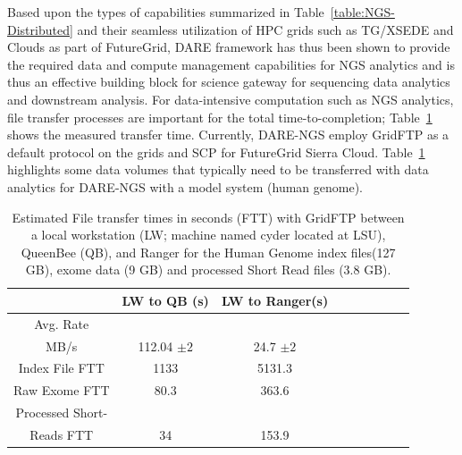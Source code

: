 \documentclass[]{svjour3}
\begin{document}

Based upon the types of capabilities summarized in
Table~\ref{table:NGS-Distributed} and their seamless utilization of
HPC grids such as TG/XSEDE and Clouds as part of
FutureGrid\cite{dare-ecmls11}, DARE framework has thus been shown to
provide the required data and compute management capabilities for NGS
analytics and is thus an effective building block for science gateway
for sequencing data analytics and downstream analysis.  For
data-intensive computation such as NGS analytics, file transfer
processes are important for the total time-to-completion;
Table~\ref{table:NGS-Distributed-file} shows the measured transfer
time. Currently, DARE-NGS employ GridFTP as a default protocol on the
grids and SCP for FutureGrid Sierra Cloud.
Table~\ref{table:NGS-Distributed-file} highlights some data volumes
that typically need to be transferred with data analytics for DARE-NGS
with a model system (human genome).


 \begin{table}
\centering
 \small
 \begin{tabular}{|c|c|c|c|c|c|c|c|c|} 
 \hline  
 	          & LW to QB (s)  & LW to Ranger(s) \\
 \hline                       
Avg. Rate && \\
MB/s & 112.04 $\pm 2$ &	    24.7 $\pm 2$  \\
 \hline                       
Index File	FTT & 1133  &	    5131.3      \\        
 \hline                       
Raw 	 Exome FTT&80.3 & 363.6\\                  
 \hline                       
Processed Short-&    & \\
Reads FTT&34&153.9  \\
 \hline                       
\end{tabular}
\caption{Estimated File transfer times in seconds (FTT) with GridFTP
  between a local workstation (LW; machine named cyder located at
  LSU), QueenBee (QB), and Ranger for the Human Genome index files(127
  GB), exome data (9 GB) and processed Short Read files (3.8 GB).}

 \label{table:NGS-Distributed-file} 
\end{table}
\end{document}
